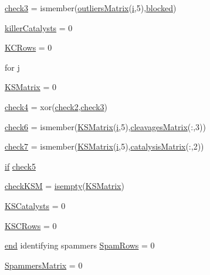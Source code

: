\begin{DoxyCompactItemize}
\item 
\hyperlink{a00029_adfd17509248a56986475a25ee50fe488}{check3} = ismember(\hyperlink{a00030_a9733b61dd859b1133aa3aa849cf70cbc}{outliers\-Matrix}(\hyperlink{a00071_ad3efca1ea6e3333daf30719ee0501862}{i},5),\hyperlink{a00030_a1faaaae288fc8ca4ed1751049aa2f84f}{blocked})
\item 
\hyperlink{a00029_a1a42aaee01b2cc37a3835e0fe30cf9d3}{killer\-Catalysts} = 0
\item 
\hyperlink{a00029_a62227634d3ceda9bf932c630583da2b9}{K\-C\-Rows} = 0
\item 
for \hyperlink{a00029_ad34e9c7e9ae69ae0b9f1866faed5e4ad}{j}
\item 
\hyperlink{a00029_aea43faf8d3d68de03c645edc96b0c1c0}{K\-S\-Matrix} = 0
\item 
\hyperlink{a00029_ab21c5bac10f7ac73374c002e908df5ac}{check4} = xor(\hyperlink{a00030_a98a8838a85ed24032563a44271b1525a}{check2},\hyperlink{a00030_adfd17509248a56986475a25ee50fe488}{check3})
\item 
\hyperlink{a00029_a0c9b097ea561ab0f23a69197786a243a}{check6} = ismember(\hyperlink{a00030_ab18f9eabd5f873bd17d226d786bc22df}{K\-S\-Matrix}(\hyperlink{a00071_ad3efca1ea6e3333daf30719ee0501862}{i},5),\hyperlink{a00030_a90d1d83fdcae4fb1cba5129d5820d33c}{cleavages\-Matrix}(\-:,3))
\item 
\hyperlink{a00029_a0bbe7d2ceb7b248f0826d069d5a1b735}{check7} = ismember(\hyperlink{a00030_ab18f9eabd5f873bd17d226d786bc22df}{K\-S\-Matrix}(\hyperlink{a00071_ad3efca1ea6e3333daf30719ee0501862}{i},5),\hyperlink{a00030_a244eec8903103b5bbddef461276286ce}{catalysis\-Matrix}(\-:,2))
\item 
\hyperlink{a00030_a01d55766b8058903dd360b4bda71f9f5}{if} \hyperlink{a00029_abee07c73829351d18ba356c86e3e096d}{check5}
\item 
\hyperlink{a00029_a67eb148eecfd241148ce3711f058ac2b}{check\-K\-S\-M} = \hyperlink{a00025_ac10445404f4b83302522defb59e25ef7}{isempty}(\hyperlink{a00030_ab18f9eabd5f873bd17d226d786bc22df}{K\-S\-Matrix})
\item 
\hyperlink{a00029_a25c085d4378366ed81f0f97547802c8f}{K\-S\-Catalysts} = 0
\item 
\hyperlink{a00029_a56aa0b3ac00410dc36f9043c641ae205}{K\-S\-C\-Rows} = 0
\item 
\hyperlink{a00025_afb358f48b1646c750fb9da6c6585be2b}{end} identifying spammers \hyperlink{a00029_a834631ce660b52d721b1dd57b60d5251}{Spam\-Rows} = 0
\item 
\hyperlink{a00029_af1801174c9397e7fad0394203f120c31}{Spammers\-Matrix} = 0

\end{DoxyCompactItemize}
